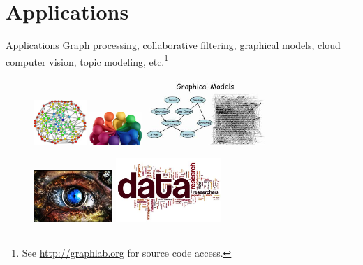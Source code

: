 \documentclass[onlymath,xcolor=pdftex,dvipsnames,table]{beamer}
\theoremstyle{remark} %
\begin{document}
\section{Applications}
\begin{frame}{Applications}
Graph processing, collaborative filtering, graphical models, cloud computer vision, topic modeling, etc.\footnote{See \url{http://graphlab.org} for source code access.}
\begin{figure}
  \centering
  \subfigure{}
    \includegraphics[width=2cm]{graph.jpg}\quad
  \subfigure{}
    \includegraphics[width=2cm]{cf.jpg}\quad
  \subfigure{}
    \includegraphics[width=4.5cm]{pgm.jpg}
\end{figure}
\begin{figure}
  \subfigure{}
    \includegraphics[width=3cm]{cv.jpg}\quad
  \subfigure{}
    \includegraphics[width=4cm]{topic.jpg}
\end{figure}
\end{frame}

\end{document}
